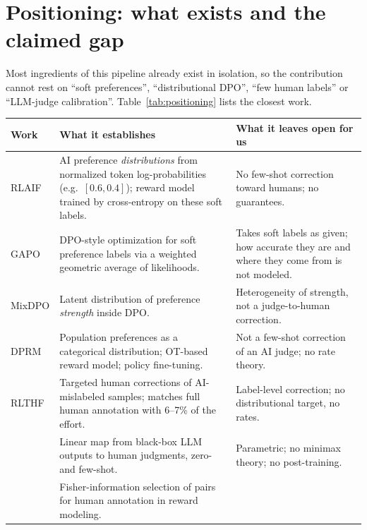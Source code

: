 \section{Positioning: what exists and the claimed gap}
\label{sec:positioning}

Most ingredients of this pipeline already exist in isolation, so the contribution cannot rest on
``soft preferences'', ``distributional DPO'', ``few human labels'' or ``LLM-judge calibration''.
Table~\ref{tab:positioning} lists the closest work.

\begin{table}[h]
\centering
\small
\renewcommand{\arraystretch}{1.15}
\begin{tabularx}{\linewidth}{@{}p{3.1cm}XX@{}}
\toprule
Work & What it establishes & What it leaves open for us \\
\midrule
RLAIF \newline \citep{lee2024rlaif} &
AI preference \emph{distributions} from normalized token log-probabilities (e.g.\ $[0.6,0.4]$);
reward model trained by cross-entropy on these soft labels. &
No few-shot correction toward humans; no guarantees. \\
GAPO \newline \citep{furuta2024gapo} &
DPO-style optimization for soft preference labels via a weighted geometric average of likelihoods. &
Takes soft labels as given; how accurate they are and where they come from is not modeled. \\
MixDPO \newline \citep{imai2026mixdpo} &
Latent distribution of preference \emph{strength} inside DPO. &
Heterogeneity of strength, not a judge-to-human correction. \\
DPRM \newline \citep{li2024dprm} &
Population preferences as a categorical distribution; OT-based reward model; policy fine-tuning. &
Not a few-shot correction of an AI judge; no rate theory. \\
RLTHF \newline \citep{xu2025rlthf} &
Targeted human corrections of AI-mislabeled samples; matches full human annotation with
6--7\% of the effort. &
Label-level correction; no distributional target, no rates. \\
\citet{vandenburg2025aligning} &
Linear map from black-box LLM outputs to human judgments, zero- and few-shot. &
Parametric; no minimax theory; no post-training. \\
\citet{shen2025active} &
Fisher-information selection of pairs for human annotation in reward modeling. &

\end{tabularx}
\end{table}
